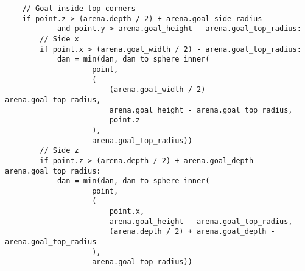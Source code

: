 \begin{verbatim}
    // Goal inside top corners
    if point.z > (arena.depth / 2) + arena.goal_side_radius
            and point.y > arena.goal_height - arena.goal_top_radius:
        // Side x
        if point.x > (arena.goal_width / 2) - arena.goal_top_radius:
            dan = min(dan, dan_to_sphere_inner(
                    point,
                    (
                        (arena.goal_width / 2) - arena.goal_top_radius,
                        arena.goal_height - arena.goal_top_radius,
                        point.z
                    ),
                    arena.goal_top_radius))
        // Side z
        if point.z > (arena.depth / 2) + arena.goal_depth - arena.goal_top_radius:
            dan = min(dan, dan_to_sphere_inner(
                    point,
                    (
                        point.x,
                        arena.goal_height - arena.goal_top_radius,
                        (arena.depth / 2) + arena.goal_depth - arena.goal_top_radius
                    ),
                    arena.goal_top_radius))


\end{verbatim}
